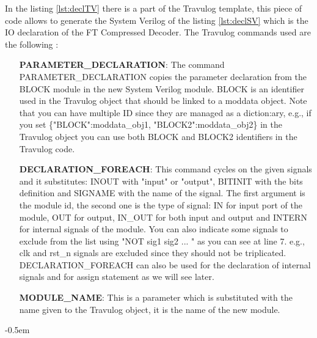 {{{    		In the listing \ref{lst:declTV} there is a part of the Travulog template, this piece of code allows to generate the System Verilog of the listing \ref{lst:declSV} which is the IO declaration of the FT Compressed Decoder. The Travulog commands used are the following : 
    		\begin{itemize}
    			\item [\textbf{PARAMETER\_DECLARATION}:] The command PARAMETER\_DECLARATION copies the parameter declaration from the BLOCK module in the new System Verilog module. BLOCK is an identifier used in the Travulog object that should be linked to a moddata object. Note that you can have multiple ID since they are managed as a diction:ary, e.g., if you set \{"BLOCK":moddata\_obj1, "BLOCK2":moddata\_obj2\} in the Travulog object you can use both BLOCK and BLOCK2 identifiers in the Travulog code.
    			\item [\textbf{DECLARATION\_FOREACH}:] This command cycles on the given signals and it substitutes: INOUT  with "input" or "output",  BITINIT with the bits definition and SIGNAME with the name of the signal. The first argument is the module id, the second one is the type of signal: IN for input port of the module, OUT for output, IN\_OUT for both input and output and INTERN for internal signals of the module. You can also indicate some signals to exclude from the list using "NOT sig1 sig2 ... " as you can see at line 7. e.g., clk and rst\_n signals are excluded since they should not be triplicated.
    			DECLARATION\_FOREACH can also be used for the declaration of internal signals and for assign statement as we will see later.
    			\item [\textbf{MODULE\_NAME}:] This is a parameter which is substituted with the name given to the Travulog object, it is the name of the new module.
    		\end{itemize}
    			
    			
    		\openup -0.5em
    		
    		\begin{parcolumns}[colwidths={1=0.54\textwidth}, distance=0.5em]{2}
\end{parcolumns}}}}

